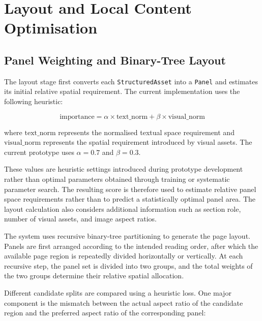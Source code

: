 \documentclass[12pt,oneside]{report}
\begin{document}
\section{Layout and Local Content Optimisation}

\subsection{Panel Weighting and Binary-Tree Layout}

The layout stage first converts each \texttt{StructuredAsset} into a \texttt{Panel} and estimates its initial relative spatial requirement. The current implementation uses the following heuristic:

$$
\mathrm{importance}
=
\alpha \times \mathrm{text\_norm}
+
\beta \times \mathrm{visual\_norm}
$$

where \(\mathrm{text\_norm}\) represents the normalised textual space requirement and \(\mathrm{visual\_norm}\) represents the spatial requirement introduced by visual assets. The current prototype uses \(\alpha=0.7\) and \(\beta=0.3\).

\vspace{1em}

These values are heuristic settings introduced during prototype development rather than optimal parameters obtained through training or systematic parameter search. The resulting score is therefore used to estimate relative panel space requirements rather than to predict a statistically optimal panel area. The layout calculation also considers additional information such as section role, number of visual assets, and image aspect ratios.

\vspace{1em}

The system uses recursive binary-tree partitioning to generate the page layout. Panels are first arranged according to the intended reading order, after which the available page region is repeatedly divided horizontally or vertically. At each recursive step, the panel set is divided into two groups, and the total weights of the two groups determine their relative spatial allocation.

\vspace{1em}

Different candidate splits are compared using a heuristic loss. One major component is the mismatch between the actual aspect ratio of the candidate region and the preferred aspect ratio of the corresponding panel:
\end{document}
